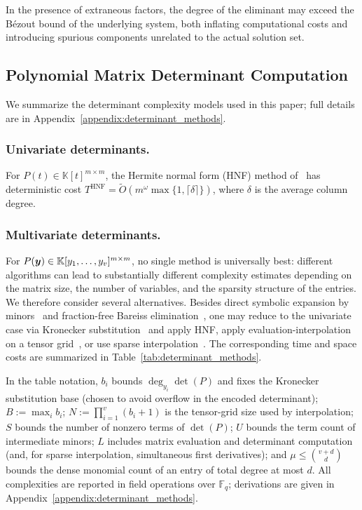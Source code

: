 In the presence of extraneous factors, the degree of the eliminant may exceed the B\'ezout bound of the underlying system, both inflating computational costs and introducing spurious components unrelated to the actual solution set.

\subsection{Polynomial Matrix Determinant Computation}\label{subsection:poly_mat_det}
We summarize the determinant complexity models used in this paper; full details are in Appendix~\ref{appendix:determinant_methods}.

\subsubsection{Univariate determinants.}
For $P(t)\in\mathbb{K}[t]^{m\times m}$, the Hermite normal form (HNF) method of~\cite{DBLP:journals/jc/LabahnNZ17} has deterministic cost $T^{\mathrm{HNF}}=\widetilde{O}(m^{\omega}\max\{1,\lceil\delta\rceil\})$, where $\delta$ is the average column degree.

\subsubsection{Multivariate determinants.}
For $P({\boldsymbol{y}})\in \mathbb{K}[y_1,\ldots,y_v]^{m\times m}$, no single method is universally best: different algorithms can lead to substantially different complexity estimates depending on the matrix size, the number of variables, and the sparsity structure of the entries. We therefore consider several alternatives. Besides direct symbolic expansion by minors~\cite{HorowitzSahni1975,GentlemanJohnson1976} and fraction-free Bareiss elimination~\cite{Bareiss1968}, one may reduce to the univariate case via Kronecker substitution~\cite{Li2007symbolic} and apply HNF, apply evaluation-interpolation on a tensor grid~\cite{HorowitzSahni1975}, or use sparse interpolation~\cite{DBLP:journals/jsc/Huang23}. The corresponding time and space costs are summarized in Table~\ref{tab:determinant_methods}.

In the table notation, $b_i$ bounds $\deg_{y_i}\det(P)$ and fixes the Kronecker substitution base (chosen to avoid overflow in the encoded determinant); $B:=\max_i b_i$; $N:=\prod_{i=1}^{v}(b_i+1)$ is the tensor-grid size used by interpolation; $S$ bounds the number of nonzero terms of $\det(P)$; $U$ bounds the term count of intermediate minors; $L$ includes matrix evaluation and determinant computation (and, for sparse interpolation, simultaneous first derivatives); and $\mu\le \binom{v+d}{d}$ bounds the dense monomial count of an entry of total degree at most $d$. All complexities are reported in field operations over $\mathbb{F}_q$; derivations are given in Appendix~\ref{appendix:determinant_methods}.

